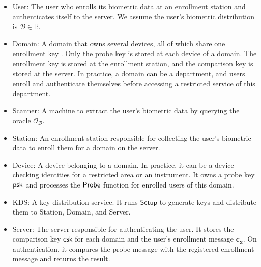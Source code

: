 \begin{itemize}

	\item \textsf{User}: The user who enrolls its biometric data at an enrollment station and authenticates itself to the server. We assume the user's biometric distribution is $\mathcal{B} \in \mathbb{B}$.
	
	\item \textsf{Domain}: A domain that owns several devices, all of which share one enrollment key . Only the probe key is stored at each device of a domain. The enrollment key is stored at the enrollment station, and the comparison key is stored at the server. In practice, a domain can be a department, and users enroll and authenticate themselves before accessing a restricted service of this department.

	\item \textsf{Scanner}: A machine to extract the user's biometric data by querying the oracle $\mathcal{O}_{\mathcal{B}}$.
	
	\item \textsf{Station}: An enrollment station responsible for collecting the user's biometric data to enroll them for a domain on the server.

	\item \textsf{Device}: A device belonging to a domain. In practice, it can be a device checking identities for a restricted area or an instrument. It owns a probe key $\sf psk$ and processes the $\sf Probe$ function for enrolled users of this domain.
	
	\item \textsf{KDS}: A key distribution service. It runs $\mathsf{Setup}$ to generate keys and distribute them to \textsf{Station}, \textsf{Domain}, and \textsf{Server}.
		
	\item \textsf{Server}: The server responsible for authenticating the user. It stores the comparison key $\mathsf{csk}$ for each domain and the user's enrollment message $\mathbf{c_x}$. On authentication, it compares the probe message with the registered enrollment message and returns the result.  

\end{itemize}





\pagebreak

\fi



